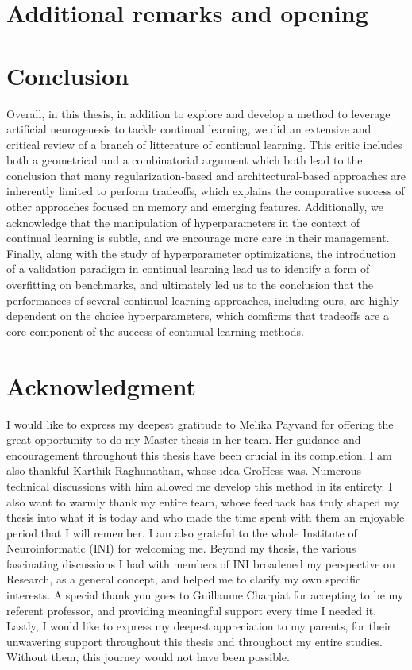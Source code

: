 \documentclass[11pt]{article}
\begin{document}
\section{Additional remarks and opening}



\section{Conclusion}


Overall, in this thesis, in addition to explore and develop a method to leverage artificial neurogenesis to tackle continual learning, we did an extensive and critical review of a branch of litterature of continual learning. This critic includes both a geometrical and a combinatorial argument which both lead to the conclusion that many regularization-based and architectural-based approaches are inherently limited to perform tradeoffs, which explains the comparative success of other approaches focused on memory and emerging features. Additionally, we acknowledge that the manipulation of hyperparameters in the context of continual learning is subtle, and we encourage more care in their management. Finally, along with the study of hyperparameter optimizations, the introduction of a validation paradigm in continual learning lead us to identify a form of overfitting on benchmarks, and ultimately led us to the conclusion that the performances of several continual learning approaches, including ours, are highly dependent on the choice hyperparameters, which comfirms that tradeoffs are a core component of the success of continual learning methods. 



\section{Acknowledgment}



I would like to express my deepest gratitude to Melika Payvand for offering the great opportunity to do my Master thesis in her team. Her guidance and encouragement throughout this thesis have been crucial in its completion. I am also thankful Karthik Raghunathan, whose idea GroHess was. Numerous technical discussions with him allowed me develop this method in its entirety. I also want to warmly thank my entire team, whose feedback has truly shaped my thesis into what it is today and who made the time spent with them an enjoyable period that I will remember. I am also grateful to the whole Institute of Neuroinformatic (INI) for welcoming me. Beyond my thesis, the various fascinating discussions I had with members of INI broadened my perspective on Research, as a general concept, and helped me to clarify my own specific interests. A special thank you goes to Guillaume Charpiat for accepting to be my referent professor, and providing meaningful support every time I needed it. Lastly, I would like to express my deepest appreciation to my parents, for their unwavering support throughout this thesis and throughout my entire studies. Without them, this journey would not have been possible.



\nocite{*}
\printbibliography
\end{document}
